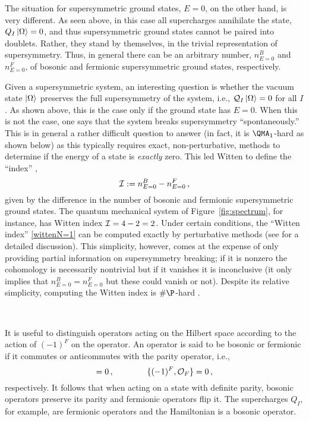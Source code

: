\documentclass[11pt]{article}
\numberwithin{equation}{section}
\def\cI{{\cal I}}
\def\cO{{\cal O}}
\def\cQ{{\cal Q}}
\newcommand\equ[1] {\begin{equation}#1\end{equation}}
\renewcommand\( {\left(}
\renewcommand\) {\right)}
\begin{document}
The situation for supersymmetric ground states, $E=0$, on the other hand,  is very different. As seen above,  in this case all supercharges annihilate the state, $Q_I\ket{\Omega}=0$, and thus  supersymmetric ground states cannot be paired into  doublets. Rather,  they  stand by themselves, in the trivial representation of supersymmetry. Thus, in general there can be an arbitrary number, $n_{E=0}^{B}$ and $n_{E=0}^{F}$, of bosonic and fermionic supersymmetric ground states, respectively.



Given a supersymmetric system, an interesting question is whether the vacuum state $\ket{\Omega}$ preserves the full supersymmetry of the system, i.e., $\cQ_I\ket{\Omega}=0$ for all $I$. As shown above, this is the case only if the ground state has $E=0$.  When this is not the case, one says that the system breaks supersymmetry ``spontaneously.'' This is in general a rather difficult question to answer (in fact, it is $\QMA_1$-hard as shown below) as this typically requires exact, non-perturbative, methods to determine if the energy of a state is {\it exactly} zero. This led Witten to define the ``index'' \cite{Witten:1982df},
\equ{\label{wittenN=1}
\cI := n^{B}_{E=0}-n^{F}_{E=0}\,,
}
given by the difference in the number of bosonic and fermionic supersymmetric ground states. The quantum mechanical system  of  Figure~\ref{fig:spectrum}, for instance, has Witten index $\cI=4-2=2$.  Under certain conditions, the ``Witten index'' \eqref{wittenN=1} can be computed exactly by perturbative methods (see \cite{Witten:1982df} for a detailed discussion). This simplicity, however, comes at the expense of only providing partial information on supersymmetry breaking; if it is nonzero the  cohomology is necessarily nontrivial but if it vanishes it is inconclusive (it only implies that $n^{B}_{E=0}=n^{F}_{E=0}$ but these could vanish or not). Despite its relative simplicity, computing the Witten index is $\#\P$-hard \cite{Crichigno:2020vue}.

\

It is useful to distinguish operators acting on the Hilbert space according to the action of $(-1)^{F}$ on the operator. An operator  is said to be bosonic or fermionic if it commutes or anticommutes with the parity operator, i.e.,  
\equ{
[(-1)^{F},\cO_{B}]=0\,,\qquad \qquad \{(-1)^{F},\cO_{F}\}=0\,,
}
respectively. It follows that when acting on a state with definite parity, bosonic operators preserve its parity and fermionic operators flip it. The supercharges $Q_{I}$, for example, are fermionic operators and the Hamiltonian is a bosonic operator.
\end{document}
